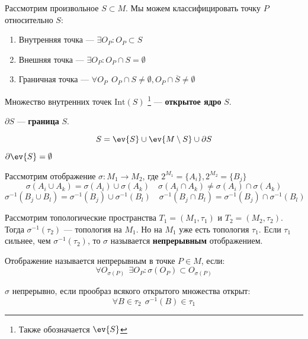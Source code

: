 Рассмотрим произвольное \(S \subset M\). Мы можем классифицировать точку \(P\) относительно  \(S\):
\begin{enumerate}
	\item Внутренняя точка --- \(\exists O_P : O_P \subset S\)
	\item Внешняя точка --- \(\exists O_P : O_P \cap S = \emptyset\)
	\item Граничная точка --- \(\forall O_P \ \ O_P \cap S \neq \emptyset, O_P \cap \overline{S} \neq \emptyset\)
\end{enumerate}

\begin{definition}
	Множество внутренних точек \(\mathrm{Int}(S)\)
	\footnote{Также обозначается \(\ev{S}\)} --- \textbf{открытое ядро} \(S\).

	\(\partial S\) --- \textbf{граница} \(S\).
\end{definition}

\[S = \ev{S} \cup \ev{M \setminus S} \cup \partial S\]

\begin{remark}
	\(\partial \ev{S} = \emptyset\)
\end{remark}

Рассмотрим отображение \(\sigma : M_1 \to M_2\),
где \(2^{M_1} = \{A_i\}, 2^{M_2} = \{B_j\}\)
\[\sigma(A_i \cup A_k) = \sigma(A_i) \cup \sigma(A_k)
	\quad \sigma(A_i \cap A_k) \neq \sigma(A_i) \cap \sigma(A_k)\]
\[\sigma^{-1}(B_j \cup B_l) = \sigma^{-1}(B_j) \cup \sigma^{-1}(B_l)
	\quad \sigma^{-1}(B_j \cap B_l) = \sigma^{-1}(B_j) \cap \sigma^{-1}(B_l)\]

\begin{definition}
	Рассмотрим топологические пространства \(T_1 = (M_1, \tau_1)\) и \(T_2 = (M_2, \tau_2)\).
	Тогда \(\sigma^{-1}(\tau_2)\) --- топология на \(M_1\).
	Но на \(M_1\) уже есть топология \(\tau_1\).
	Если \(\tau_1\) сильнее, чем \(\sigma^{-1}(\tau_2)\), то \(\sigma\) называется \textbf{непрерывным} отображением.
\end{definition}

\begin{definition}
	Отображение называется непрерывным в точке \(P \in M\), если:
	\[\forall O_{\sigma(P)} \ \ \exists O_P : \sigma(O_P) \subset O_{\sigma(P)}\]
\end{definition}

\begin{definition}
	\(\sigma\) непрерывно, если прообраз всякого открытого множества открыт:
	\[\forall B \in \tau_2 \ \ \sigma^{-1}(B) \in \tau_1\]
\end{definition}

